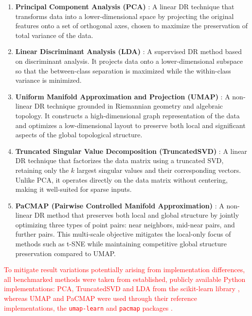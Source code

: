 \documentclass[a4paper,fleqn]{cas-dc}
\begin{document}
\begin{enumerate}
    \item \textbf{Principal Component Analysis (PCA)} \cite{pca}: A linear DR technique that transforms data into a lower-dimensional space by projecting the original features onto a set of orthogonal axes, chosen to maximize the preservation of total variance of the data.
    \item \textbf{Linear Discriminant Analysis (LDA)} \citep{fisher1936, rao1948}: A supervised DR method based on discriminant analysis. It projects data onto a lower-dimensional subspace so that the between-class separation is maximized while the within-class variance is minimized.
    \item \textbf{Uniform Manifold Approximation and Projection (UMAP)} \cite{mcinnes2018}: A non-linear DR technique grounded in Riemannian geometry and algebraic topology. It constructs a high-dimensional graph representation of the data and optimizes a low-dimensional layout to preserve both local and significant aspects of the global topological structure.

    \item \textbf{Truncated Singular Value Decomposition (TruncatedSVD)} \cite{tsvd}: A linear
    DR technique that factorizes the data matrix using a
    truncated SVD, retaining only the $k$ largest singular values and their
    corresponding vectors. Unlike PCA, it operates directly on the data matrix
    without centering, making it well-suited for sparse inputs.

    \item \textbf{PaCMAP (Pairwise Controlled Manifold Approximation)} \cite{pacmap}: A
    non-linear DR method that preserves both local and
    global structure by jointly optimizing three types of point pairs: near
    neighbors, mid-near pairs, and further pairs. This multi-scale objective
    mitigates the local-only focus of methods such as t-SNE while maintaining
    competitive global structure preservation compared to UMAP.
\end{enumerate}

\textcolor{red}{To mitigate result variations potentially arising from implementation differences, all benchmarked methods were taken from established, publicly available Python implementations: PCA, TruncatedSVD and LDA from the scikit-learn library \cite{scikit-learn}, whereas UMAP and PaCMAP were used through their reference implementations, the \texttt{umap-learn} and \texttt{pacmap} packages \cite{mcinnes2018, pacmap}.}
\end{document}
